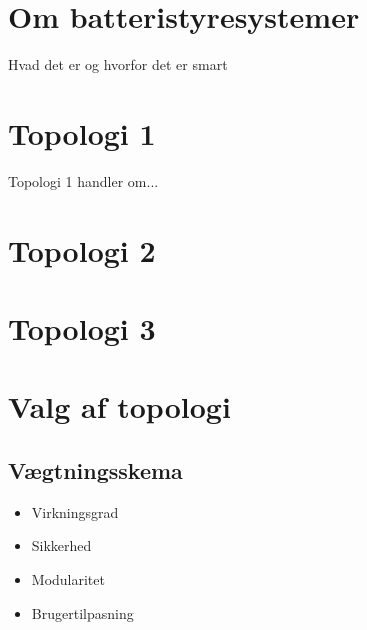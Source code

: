 \section{Om batteristyresystemer}
Hvad det er og hvorfor det er smart
\section{Topologi 1}

Topologi 1 handler om...

\section{Topologi 2}

\section{Topologi 3}

\section{Valg af topologi}

\subsection{Vægtningsskema}

\begin{itemize}
	\item Virkningsgrad
	\item Sikkerhed
	\item Modularitet
	\item Brugertilpasning
\end{itemize}